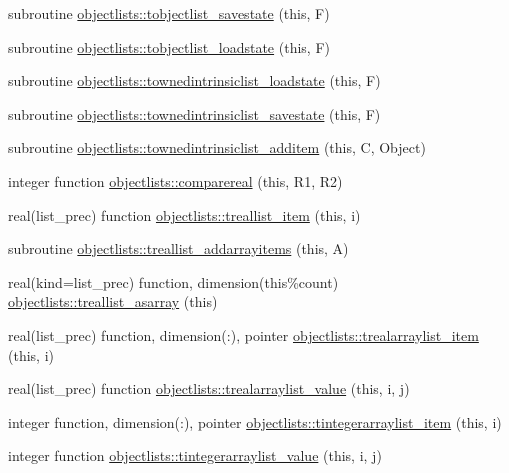 \begin{DoxyCompactItemize}
\item 
subroutine \mbox{\hyperlink{namespaceobjectlists_a5bd3b270e5c0f08c54a0a72838aa7b95}{objectlists\+::tobjectlist\+\_\+savestate}} (this, F)
\item 
subroutine \mbox{\hyperlink{namespaceobjectlists_a198a78c4eeeccbbfa31216f589beda86}{objectlists\+::tobjectlist\+\_\+loadstate}} (this, F)
\item 
subroutine \mbox{\hyperlink{namespaceobjectlists_a7b384ff8ee40c65239ebe5c1a7d239ff}{objectlists\+::townedintrinsiclist\+\_\+loadstate}} (this, F)
\item 
subroutine \mbox{\hyperlink{namespaceobjectlists_ab634ab92805c172a136d35becaf7601b}{objectlists\+::townedintrinsiclist\+\_\+savestate}} (this, F)
\item 
subroutine \mbox{\hyperlink{namespaceobjectlists_a8a73104aaeee3be757486f8ed7ecf1af}{objectlists\+::townedintrinsiclist\+\_\+additem}} (this, C, Object)
\item 
integer function \mbox{\hyperlink{namespaceobjectlists_ac923fbeb64f1caebb0cd581988e43978}{objectlists\+::comparereal}} (this, R1, R2)
\item 
real(list\+\_\+prec) function \mbox{\hyperlink{namespaceobjectlists_a7f2de098afb2605d8dccf08bd7daca10}{objectlists\+::treallist\+\_\+item}} (this, i)
\item 
subroutine \mbox{\hyperlink{namespaceobjectlists_ae3cae7b25174f6f119f19e9c5f44dc44}{objectlists\+::treallist\+\_\+addarrayitems}} (this, A)
\item 
real(kind=list\+\_\+prec) function, dimension(this\%count) \mbox{\hyperlink{namespaceobjectlists_a06b8548c6daa95a52c2c3d2a3fe587dc}{objectlists\+::treallist\+\_\+asarray}} (this)
\item 
real(list\+\_\+prec) function, dimension(\+:), pointer \mbox{\hyperlink{namespaceobjectlists_afec6c1eefcdae12eeddeb762eb1e24eb}{objectlists\+::trealarraylist\+\_\+item}} (this, i)
\item 
real(list\+\_\+prec) function \mbox{\hyperlink{namespaceobjectlists_a12e74f409aae2d6481803ca8e3348d2f}{objectlists\+::trealarraylist\+\_\+value}} (this, i, j)
\item 
integer function, dimension(\+:), pointer \mbox{\hyperlink{namespaceobjectlists_af82a464969f9660d2a7214413b8fe757}{objectlists\+::tintegerarraylist\+\_\+item}} (this, i)
\item 
integer function \mbox{\hyperlink{namespaceobjectlists_ab4bb3c50d65c18a798906fa87ad4a651}{objectlists\+::tintegerarraylist\+\_\+value}} (this, i, j)
\item 

\end{DoxyCompactItemize}

